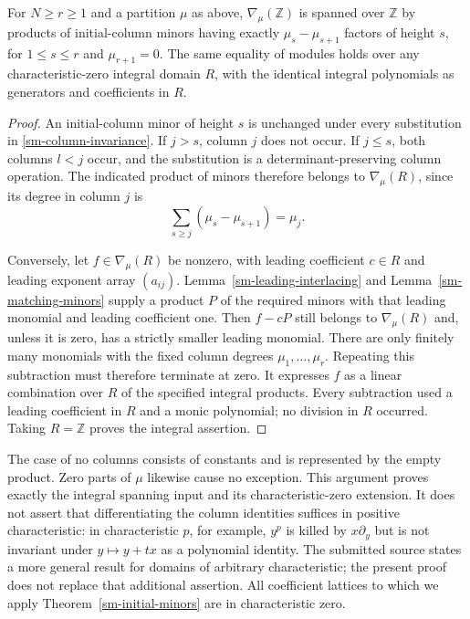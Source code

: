 \begin{theorem}
\label{sm-initial-minors}
For $N\ge r\ge1$ and a partition $\mu$ as above,
$\nabla_\mu(\mathbb Z)$ is spanned over $\mathbb Z$ by products
of initial-column minors having exactly $\mu_s-\mu_{s+1}$ factors
of height $s$, for $1\le s\le r$ and $\mu_{r+1}=0$.
The same equality of modules holds over any characteristic-zero
integral domain $R$, with the identical integral polynomials as
generators and coefficients in $R$.
\end{theorem}
\begin{proof}
An initial-column minor of height $s$ is unchanged under every
substitution in \eqref{sm-column-invariance}. If $j>s$, column $j$
does not occur. If $j\le s$, both columns $l<j$ occur, and the
substitution is a determinant-preserving column operation.
The indicated product of minors therefore belongs to
$\nabla_\mu(R)$, since its degree in column $j$ is
\[
                     \sum_{s\ge j}(\mu_s-\mu_{s+1})=\mu_j.
\]

Conversely, let $f\in\nabla_\mu(R)$ be nonzero, with leading
coefficient $c\in R$ and leading exponent array $(a_{ij})$.
Lemma~\ref{sm-leading-interlacing} and
Lemma~\ref{sm-matching-minors} supply a product $P$ of the required
minors with that leading monomial and leading coefficient one.
Then $f-cP$ still belongs to $\nabla_\mu(R)$ and, unless it is
zero, has a strictly smaller leading monomial.
There are only finitely many monomials with the fixed column degrees
$\mu_1,\ldots,\mu_r$. Repeating this subtraction must therefore
terminate at zero. It expresses $f$ as a linear combination over
$R$ of the specified integral products. Every subtraction used a
leading coefficient in $R$ and a monic polynomial; no division in
$R$ occurred. Taking $R=\mathbb Z$ proves the integral assertion.
\end{proof}

The case of no columns consists of constants and is represented by
the empty product. Zero parts of $\mu$ likewise cause no exception.
This argument proves exactly the integral spanning input and its
characteristic-zero extension. It does not assert that differentiating
the column identities suffices in positive characteristic: in
characteristic $p$, for example, $y^p$ is killed by
$x\partial_y$ but is not invariant under $y\mapsto y+tx$ as a
polynomial identity. The submitted source states a more general
result for domains of arbitrary characteristic; the present proof
does not replace that additional assertion. All coefficient lattices
to which we apply Theorem~\ref{sm-initial-minors} are in
characteristic zero.


